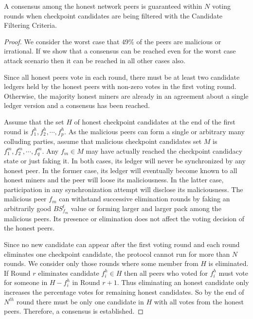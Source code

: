 \begin{lemma}
\label{l-consensus}
A consensus among the honest network peers is guaranteed within $N$ voting rounds when checkpoint candidates are being filtered with the Candidate Filtering Criteria. 
\end{lemma}  
\begin{proof}
We consider the worst case that $49\%$ of the peers are malicious or irrational. If we show that a consensus can be reached even for the worst case attack scenario then it can be reached in all other cases also.

Since all honest peers vote in each round, there must be at least two candidate ledgers held by the honest peers with non-zero votes in the first voting round. Otherwise, the majority honest miners are already in an agreement about a single ledger version and a consensus has been reached. 

Assume that the set $H$ of honest checkpoint candidates at the end of the first round is ${f_1^h, f_2^h, \cdots, f_p^h}$. As the malicious peers can form a single or arbitrary many colluding parties, assume that malicious checkpoint candidates set $M$ is ${f_1^m, f_2^m, \cdots, f_q^m}$. Any $f_m \in M$ may have actually reached the checkpoint candidacy state or just faking it. In both cases, its ledger will never be synchronized by any honest peer. In the former case, its ledger will eventually become known to all honest miners and the peer will loose its maliciousness. In the latter case, participation in any synchronization attempt will disclose its maliciousness. The malicious peer $f_m$ can withstand successive elimination rounds by faking an arbitrarily good $BS_{f_m}^t$ value or forming larger and larger pack among the malicious peers. Its presence or elimination does not affect the voting decision of the honest peers. 

Since no new candidate can appear after the first voting round and each round eliminates one checkpoint candidate, the protocol cannot run for more than $N$ rounds. We consider only those rounds where some member from $H$ is eliminated. If Round $r$ eliminates candidate $f_i^h \in H$ then all peers who voted for $f_i^h$ must vote for someone in $H - {f_i^h}$ in Round $r + 1$. Thus eliminating an honest candidate only increases the percentage votes for remaining honest candidates. So by the end of $N^{th}$ round there must be only one candidate in $H$ with all votes from the honest peers. Therefore, a consensus is established.                
\end{proof}

